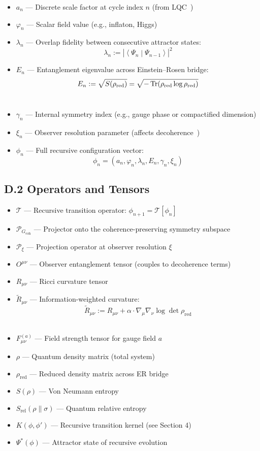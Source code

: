 \documentclass[11pt]{article}
\begin{document}
\begin{itemize}[leftmargin=1.5em]
  \item $a_n$ — Discrete scale factor at cycle index $n$ (from LQC~\cite{ashtekar2006quantum})
  \item $\varphi_n$ — Scalar field value (e.g., inflaton, Higgs)
  \item $\lambda_n$ — Overlap fidelity between consecutive attractor states:
  \[
  \lambda_n := \left| \left\langle \Psi_n \middle| \Psi_{n-1} \right\rangle \right|^2
  \]
  \item $E_n$ — Entanglement eigenvalue across Einstein–Rosen bridge:
  \[
  E_n := \sqrt{S(\rho_{\text{red}})} = \sqrt{ -\Tr(\rho_{\text{red}} \log \rho_{\text{red}}) }
  \]
  ~\cite{maldacena2013cool}
  \item $\gamma_n$ — Internal symmetry index (e.g., gauge phase or compactified dimension)
  \item $\xi_n$ — Observer resolution parameter (affects decoherence~\cite{zurek2003decoherence})
  \item $\phi_n$ — Full recursive configuration vector:
  \[
  \phi_n = (a_n, \varphi_n, \lambda_n, E_n, \gamma_n, \xi_n)
  \]
\end{itemize}

\subsection*{D.2 Operators and Tensors}

\begin{itemize}[leftmargin=1.5em]
  \item $\mathcal{T}$ — Recursive transition operator: $\phi_{n+1} = \mathcal{T}[\phi_n]$
  \item $\mathcal{P}_{G_{\text{coh}}}$ — Projector onto the coherence-preserving symmetry subspace
  \item $\mathcal{P}_{\xi}$ — Projection operator at observer resolution $\xi$
  \item $O^{\mu\nu}$ — Observer entanglement tensor (couples to decoherence terms)
  \item $R_{\mu\nu}$ — Ricci curvature tensor
  \item $\widetilde{R}_{\mu\nu}$ — Information-weighted curvature:
  \[
  \widetilde{R}_{\mu\nu} := R_{\mu\nu} + \alpha \cdot \nabla_\mu \nabla_\nu \log \det \rho_{\text{red}}
  \]
  ~\cite{verlinde2011emergent}
  \item $F_{\mu\nu}^{(a)}$ — Field strength tensor for gauge field $a$
  \item $\rho$ — Quantum density matrix (total system)
  \item $\rho_{\text{red}}$ — Reduced density matrix across ER bridge
  \item $S(\rho)$ — Von Neumann entropy
  \item $S_{\text{rel}}(\rho \| \sigma)$ — Quantum relative entropy~\cite{nielsen2010quantum}
  \item $K(\phi, \phi')$ — Recursive transition kernel (see Section 4)
  \item $\Psi^*(\phi)$ — Attractor state of recursive evolution
\end{itemize}
\end{document}
